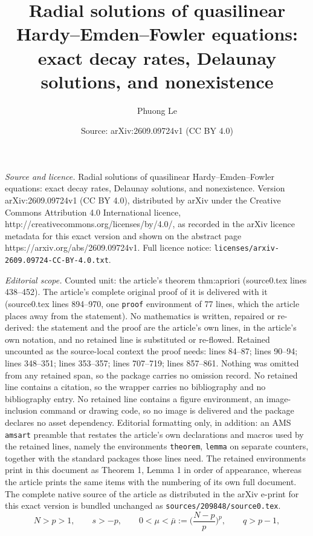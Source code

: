 \documentclass[10pt,a4paper]{amsart}
\title{Radial solutions of quasilinear Hardy--Emden--Fowler equations: exact decay rates, Delaunay solutions, and nonexistence}
\author{Phuong Le}
\date{Source: arXiv:2609.09724v1 (CC BY 4.0)}
\newcommand{\mub}{\bar\mu}
\begin{document}
\maketitle

\noindent\emph{Source and licence.} Radial solutions of quasilinear Hardy--Emden--Fowler equations: exact decay rates, Delaunay solutions, and nonexistence. Version arXiv:2609.09724v1 (CC BY 4.0), distributed by arXiv under the Creative Commons Attribution 4.0 International licence, http://creativecommons.org/licenses/by/4.0/, as recorded in the arXiv licence metadata for this exact version and shown on the abstract page https://arxiv.org/abs/2609.09724v1. Full licence notice: \texttt{licenses/arxiv-2609.09724-CC-BY-4.0.txt}.\par\smallskip

\noindent\textit{Editorial scope.} Counted unit: the article's theorem thm:apriori (source0.tex lines 438--452). The article's complete original proof of it is delivered with it (source0.tex lines 894--970, one \texttt{proof} environment of 77 lines, which the article places away from the statement). No mathematics is written, repaired or re-derived: the statement and the proof are the article's own lines, in the article's own notation, and no retained line is substituted or re-flowed.  Retained uncounted as the source-local context the proof needs: lines 84--87; lines 90--94; lines 348--351; lines 353--357; lines 707--719; lines 857--861.  Nothing was omitted from any retained span, so the package carries no omission record.  No retained line contains a citation, so the wrapper carries no bibliography and no bibliography entry.  No retained line contains a figure environment, an image-inclusion command or drawing code, so no image is delivered and the package declares no asset dependency.  Editorial formatting only, in addition: an AMS \texttt{amsart} preamble that restates the article's own declarations and macros used by the retained lines, namely the environments \texttt{theorem}, \texttt{lemma} on separate counters, together with the standard packages those lines need.  The retained environments print in this document as Theorem 1, Lemma 1 in order of appearance, whereas the article prints the same items with the numbering of its own full document.  The complete native source of the article as distributed in the arXiv e-print for this exact version is bundled unchanged as \texttt{sources/209848/source0.tex}.
\begin{equation}\label{eq:standing}
N>p>1,\qquad s>-p,\qquad 0<\mu<\mub:=\Big(\frac{N-p}{p}\Big)^{p},
\qquad q>p-1,
\end{equation}
\end{document}
